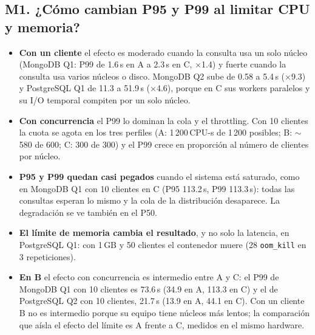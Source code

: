 \documentclass[11pt,letterpaper]{article}
\begin{document}
\subsection*{M1. ¿Cómo cambian P95 y P99 al limitar CPU y memoria?}
\begin{itemize}
  \item \textbf{Con un cliente} el efecto es moderado cuando la consulta usa un solo núcleo
        (MongoDB Q1: P99 de 1.6\,s en A a 2.3\,s en C, $\times$1.4) y fuerte cuando la consulta
        usa varios núcleos o disco. MongoDB Q2 sube de 0.58 a 5.4\,s ($\times$9.3) y PostgreSQL Q1
        de 11.3 a 51.9\,s ($\times$4.6), porque en C sus workers paralelos y su I/O temporal
        compiten por un solo núcleo.
  \item \textbf{Con concurrencia} el P99 lo dominan la cola y el throttling. Con 10 clientes la
        cuota se agota en los tres perfiles (A: 1\,200\,CPU-s de 1\,200 posibles; B: $\sim$580
        de 600; C: 300 de 300) y el P99 crece en proporción al número de clientes por núcleo.
  \item \textbf{P95 y P99 quedan casi pegados} cuando el sistema está saturado, como en MongoDB Q1
        con 10 clientes en C (P95 113.2\,s, P99 113.3\,s): todas las consultas esperan lo mismo y
        la cola de la distribución desaparece. La degradación se ve también en el P50.
  \item \textbf{El límite de memoria cambia el resultado}, y no solo la latencia, en PostgreSQL Q1:
        con 1\,GB y 50 clientes el contenedor muere (28 \texttt{oom\_kill} en 3 repeticiones).
  \item \textbf{En B} el efecto con concurrencia es intermedio entre A y C: el P99 de MongoDB Q1
        con 10 clientes es 73.6\,s (34.9 en A, 113.3 en C) y el de PostgreSQL Q2 con 10 clientes,
        21.7\,s (13.9 en A, 44.1 en C). Con un cliente B no es intermedio porque su
        equipo tiene núcleos más lentos; la comparación que aísla el efecto del límite es A frente
        a C, medidos en el mismo hardware.
\end{itemize}
\end{document}
